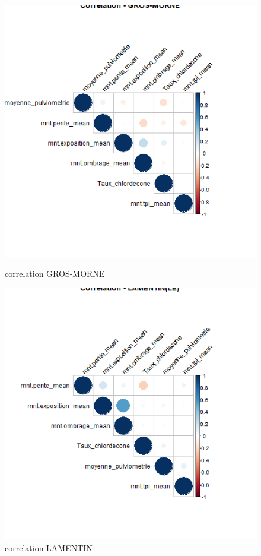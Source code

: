 \documentclass{report}
\begin{document}
\begin{figure}[H]
\begin{minipage}[t]{0.45\linewidth}
\centering
\includegraphics[width =
0.6\linewidth]{correlation_GROS-MORNE.png}
\caption{correlation GROS-MORNE}
\end{minipage}
\hfill
\begin{minipage}[t]{0.45\linewidth}
\includegraphics[width = 0.6
\linewidth]{correlation_LAMENTIN(LE).png}
\caption{correlation LAMENTIN}
\end{minipage}
\end{figure}
\end{document}
